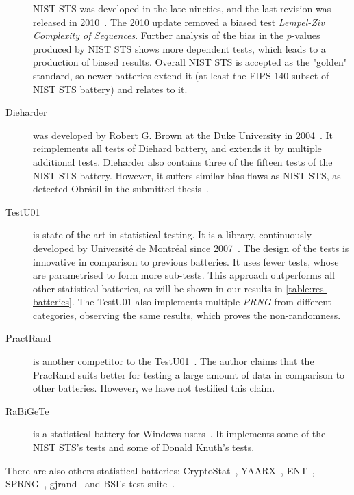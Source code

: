 \documentclass[
    digital,    %
    oneside,    %
    color,
    11pt,
    nocover,
    notable,
    nolof,
    nolot,
]{fithesis3}
\begin{document}
\begin{description}
    NIST STS was developed in the late nineties, and the last revision was released in 2010~\cite{rukhin2001statistical}. The 2010 update removed a biased test \textit{Lempel-Ziv Complexity of Sequences}. Further analysis of the bias in the $p$-values produced by NIST STS shows more dependent tests, which leads to a production of biased results. Overall NIST STS is accepted as the "golden" standard, so newer batteries extend it (at least the FIPS 140 subset of NIST STS battery) and relates to it. %
    \item[Dieharder] was developed by Robert G. Brown at the Duke University in 2004~\cite{brown2013dieharder}. It reimplements all tests of Diehard battery, and extends it by multiple additional tests. Dieharder also contains three of the fifteen tests of the NIST STS battery. However, it suffers similar bias flaws as NIST STS, as detected Obrátil in the submitted thesis~\cite{obratilMgrThesis}. %
    \item[TestU01] is state of the art in statistical testing. It is a library, continuously developed by Université de Montréal since 2007~\cite{l2007testu01}. The design of the tests is innovative in comparison to previous batteries. It uses fewer tests, whose are parametrised to form more sub-tests. This approach outperforms all other statistical batteries, as will be shown in our results in \cref{table:res-batteries}. The TestU01 also implements multiple \textit{PRNG} from different categories, observing the same results, which proves the non-randomness. %

    \item[PractRand] is another competitor to the TestU01~\cite{dotypractically}. The author claims that the PracRand suits better for testing a large amount of data in comparison to other batteries. However, we have not testified this claim.
    \item[RaBiGeTe] is a statistical battery for Windows users~\cite{rabigete}. It implements some of the NIST STS's tests and some of Donald Knuth's tests.
\end{description}

There are also others statistical batteries: CryptoStat~\cite{kaminsky2013cryptostat}, YAARX~\cite{biryukov2014automatic}, ENT~\cite{walker2008ent}, SPRNG~\cite{mascagni2000algorithm}, gjrand~\cite{gjrand} and BSI's test suite~\cite{schindler2002evaluation}.

\end{document}
